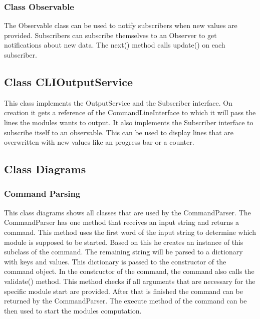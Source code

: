 \documentclass[parskip=full]{scrartcl}
\begin{document}
\subsubsection{Class Observable} 
The Observable class can be used to notify subscribers when new values are provided.
Subscribers can subscribe themselves to an Observer to get notifications about new data.
The next() method calls update() on each subscriber.

\subsection{Class CLIOutputService}
This class implements the OutputService and the Subscriber interface. 
On creation it gets a reference of the CommandLineInterface to which it will pass the lines the modules wants to output.
It also implements the Subscriber interface to subscribe itself to an observable.
This can be used to display lines that are overwritten with new values like an progress bar or a counter.

\newpage

\subsection{Class Diagrams}

\subsubsection{Command Parsing}

\begin{figure}[h]
\begin{center}

\label{Command Parsing}
\end{center}
\end{figure}
\newpage

This class diagrams shows all classes that are used by the CommandParser.
The CommandParser has one method that receives an input string and returns a command.
This method uses the first word of the input string to determine which module is supposed to be started.
Based on this he creates an instance of this subclass of the command.
The remaining string will be parsed to a dictionary with keys and values.
This dictionary is passed to the constructor of the command object.
In the constructor of the command, the command also calls the validate() method.
This method checks if all arguments that are necessary for the specific module start are provided.
After that is finished the command can be returned by the CommandParser.
The execute method of the command can be then used to start the modules computation.
\end{document}
